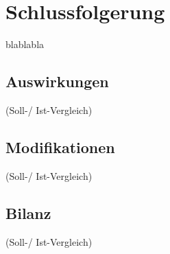 \section{Schlussfolgerung}
\label{sec:description:schlussfolgerung}
blablabla

\subsection{Auswirkungen}
\label{subsec:description:auswirkungen}
(Soll-/ Ist-Vergleich)

\subsection{Modifikationen}
\label{subsec:description:modifikationen}
(Soll-/ Ist-Vergleich)

\subsection{Bilanz}
\label{subsec:description:bilanz}
(Soll-/ Ist-Vergleich)
